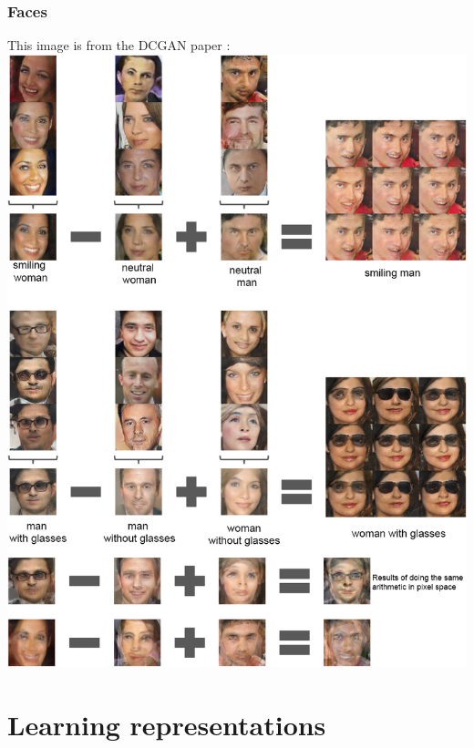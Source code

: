 \documentclass{beamer}
\begin{document}
\begin{frame}
\frametitle{Faces}
This image is from the DCGAN paper \cite{repLearnDcgan}:
\includegraphics[scale=0.15]{woman-with-glasses}
\end{frame}


\section{Learning representations}
\end{document}
